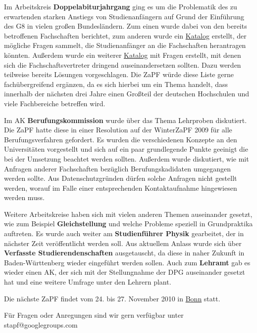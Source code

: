 \documentclass{scrartcl}
\begin{document}
Im Arbeitskreis \textbf{Doppelabiturjahrgang} ging es um die Problematik des zu erwartenden starken Anstiegs von
Studienanfängern auf Grund der Einführung des G8 in vielen großen Bundesländern. Zum einen wurde dabei von den bereits
betroffenen Fachschaften berichtet, zum anderen wurde ein
\href{https://zapf.wiki/Doppeljahrgang}{Katalog} erstellt, der mögliche Fragen sammelt, die
Studienanfänger an die Fachschaften herantragen könnten. Außerdem wurde ein weiterer
\href{https://zapf.wiki/Doppeljahrgang}{Katalog} mit Fragen erstellt, mit denen sich die
Fachschaftsvertreter dringend auseinandersetzen sollten. Dazu werden teilweise bereits Lösungen vorgeschlagen. Die ZaPF
würde diese Liste gerne fachübergreifend ergänzen, da es sich hierbei um ein Thema handelt, dass innerhalb der nächsten
drei Jahre einen Großteil der deutschen Hochschulen und viele Fachbereiche betreffen wird.



Im AK \textbf{Berufungskommission} wurde über das Thema Lehrproben diskutiert. Die ZaPF hatte diese in einer
Resolution auf der WinterZaPF 2009 für alle Berufungsverfahren gefordert. Es
wurden die verschiedenen Konzepte an den Universitäten vorgestellt und sich auf ein paar grundlegende Punkte
geeinigt die bei der Umsetzung beachtet werden sollten. Außerdem wurde diskutiert, wie mit Anfragen anderer
Fachschaften bezüglich Berufungskadidaten umgegangen werden sollte. Aus Datenschutzgründen dürfen solche Anfragen
nicht gestellt werden, worauf im Falle einer entsprechenden Kontaktaufnahme hingewiesen werden muss.

Weitere Arbeitskreise haben sich mit vielen anderen Themen auseinander gesetzt, wie zum Beispiel
\textbf{Gleichstellung} und welche Probleme speziell in Grundpraktika auftreten. Es wurde auch weiter am
\textbf{Studienführer Physik} gearbeitet, der in nächster Zeit veröffentlicht werden soll. Aus aktuellem Anlass wurde
sich über \textbf{Verfasste Studierendenschaften} ausgetauscht, da diese in naher Zukunft in Baden-Württenberg wieder
eingeführt werden sollen. Auch zum \textbf{Lehramt} gab es wieder einen AK, der sich mit der
Stellungnahme der DPG auseinander gesetzt hat und eine weitere Umfrage unter
den Lehrern plant.

\vspace{0.5cm}
Die nächste ZaPF findet vom 24. bis 27. November 2010 in \href{http://zapfibo.de}{Bonn} statt.

Für Fragen oder Anregungen sind wir gern verfügbar unter stapf@googlegroups.com
\end{document}
